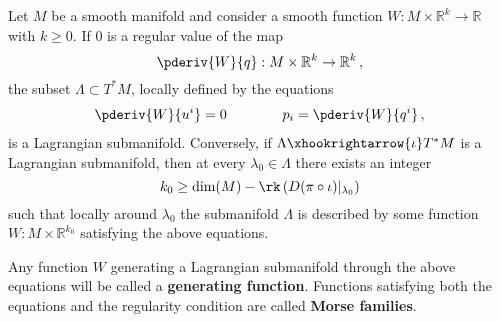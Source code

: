     \begin{theorem}\label{symplectic:maslow_hormander}
        Let $M$ be a smooth manifold and consider a smooth function $W:M\times\mathbb{R}^k\rightarrow\mathbb{R}$ with $k\geq 0$. If 0 is a regular value of the map \[\pderiv{W}{q}:M\times\mathbb{R}^k\rightarrow\mathbb{R}^k\,,\] the subset $\Lambda\subset T^*M$, locally defined by the equations
        \begin{gather}
            \pderiv{W}{u^i} = 0 \qquad\qquad p_i=\pderiv{W}{q^i}\,,
        \end{gather}
        is a Lagrangian submanifold. Conversely, if $\Lambda\xhookrightarrow{\iota}T^*M$ is a Lagrangian submanifold, then at every $\lambda_0\in\Lambda$ there exists an integer \[k_0\geq\dim(M) - \rk\left(D(\pi\circ\iota)|_{\lambda_0}\right)\] such that locally around $\lambda_0$ the submanifold $\Lambda$ is described by some function $W:M\times\mathbb{R}^{k_0}$ satisfying the above equations.
    \end{theorem}
    Any function $W$ generating a Lagrangian submanifold through the above equations will be called a \textbf{generating function}. Functions satisfying both the equations and the regularity condition are called \textbf{Morse families}.



